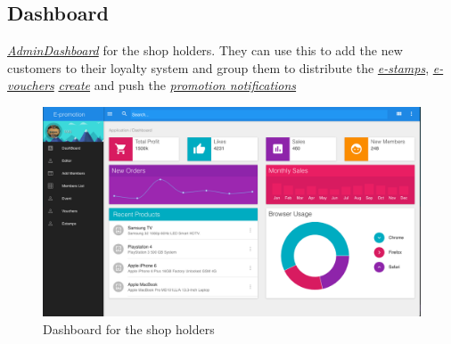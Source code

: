 \documentclass[12pt]{scrartcl}
\begin{document}
\subsection{Dashboard}
\label{sec:org48d675d}
\hyperref[fig:orgb704847]{\emph{AdminDashboard}} for the shop holders. They can use this to
add the new customers to their loyalty system and group them to distribute
the \hyperref[fig:org4f8b0d1]{\emph{e-stamps}}, \hyperref[fig:orgbb5aa01]{\emph{e-vouchers}} \hyperref[fig:org90ab7ca]{\emph{create}} and push the \hyperref[fig:orgfa04102]{\emph{promotion notifications}}
\begin{figure}[htbp]
\caption{\label{fig:orgb704847}
Dashboard for the shop holders}
\centering
\includegraphics[width=.9\linewidth]{./img/dashboard.png}
\end{figure}
\end{document}
